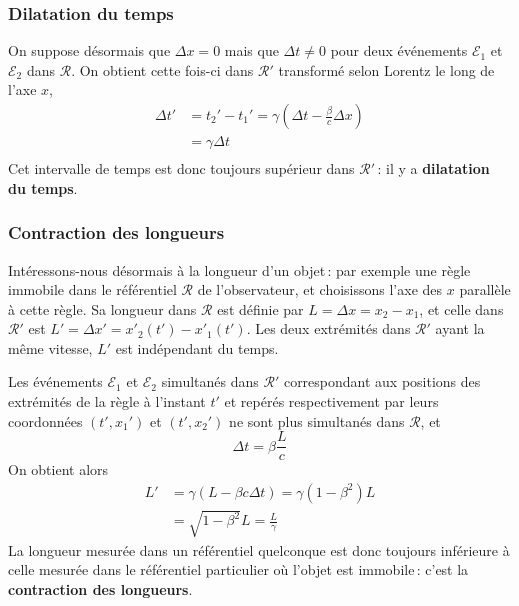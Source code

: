         \subsubsection{Dilatation du temps}

        On suppose désormais que $\Delta x = 0$ mais que $\Delta t \neq 0$ pour deux événements $\mathcal{E}_1$ et $\mathcal{E}_2$ dans $\mathcal{R}$. On obtient cette fois-ci dans $\mathcal{R}'$ transformé selon Lorentz le long de l’axe $x$, 
        \begin{align*}
            \Delta t' 
            &= t_2' - t_1' = \gamma\left(\Delta t - \frac{\beta}{c} \Delta x\right) \\
            &= \gamma \Delta t \\
        \end{align*}
        Cet intervalle de temps est donc toujours supérieur dans $\mathcal{R}'$ : il y a \textbf{dilatation du temps}.

        \subsubsection{Contraction des longueurs}

        Intéressons-nous désormais à la longueur d’un objet : par exemple une règle immobile dans le référentiel $\mathcal{R}$ de l’observateur, et choisissons l’axe des $x$ parallèle à cette règle. Sa longueur dans $\mathcal{R}$ est définie par $L = \Delta x = x_2 - x_1$, et celle dans $\mathcal{R}'$ est $L' = \Delta x' = x'_2(t') - x'_1(t')$. Les deux extrémités dans $\mathcal{R}'$ ayant la même vitesse, $L'$ est indépendant du temps. 

        Les événements $\mathcal{E}_1$ et $\mathcal{E}_2$ simultanés dans $\mathcal{R}'$ correspondant aux positions des extrémités de la règle à l’instant $t'$ et repérés respectivement par leurs coordonnées $(t', x_1')$ et $(t', x_2')$ ne sont plus simultanés dans $\mathcal{R}$, et 
        \[ \Delta t = \beta \frac{L}{c} \]   
        On obtient alors 
        \begin{align*}
            L' 
            &= \gamma (L - \beta c \Delta t) = \gamma (1 - \beta^2) L \\
            &= \sqrt{1- \beta^2} L = \frac{L}{\gamma}
        \end{align*}
        La longueur mesurée dans un référentiel quelconque est donc toujours inférieure à celle mesurée dans le référentiel particulier où l’objet est immobile : c’est la \textbf{contraction des longueurs}.

